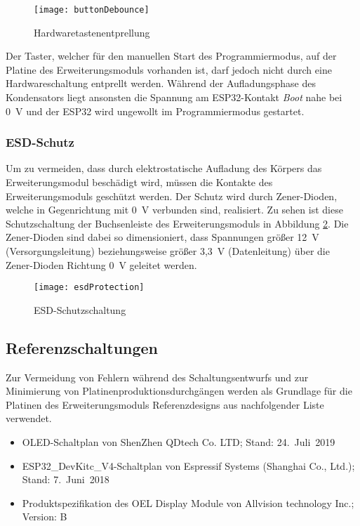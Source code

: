 \begin{figure}[h]
    \centering
    \texttt{[image: buttonDebounce]}
    \caption{Hardwaretastenentprellung}
    \label{fig:buttonDebounce}
\end{figure}

Der Taster, welcher für den manuellen Start des Programmiermodus, auf der Platine des Erweiterungsmoduls vorhanden ist, darf jedoch nicht durch eine Hardwareschaltung entprellt werden.  Während der Aufladungsphase des Kondensators liegt ansonsten die Spannung am ESP32-Kontakt \textit{Boot} nahe bei 0~V und der ESP32 wird ungewollt im Programmiermodus gestartet.

\subsubsection{\acf{ESD}-Schutz}
\label{section:esdProtection}
Um zu vermeiden, dass durch elektrostatische Aufladung des Körpers das Erweiterungsmodul beschädigt wird, müssen die Kontakte des Erweiterungsmoduls geschützt werden. Der Schutz wird durch Zener-Dioden, welche in Gegenrichtung mit 0~V verbunden sind, realisiert. Zu sehen ist diese Schutzschaltung der Buchsenleiste des Erweiterungsmoduls in Abbildung \ref{fig:esdProtection}. Die Zener-Dioden sind dabei so dimensioniert, dass Spannungen größer 12~V (Versorgungsleitung) beziehungsweise größer 3,3~V (Datenleitung) über die Zener-Dioden Richtung 0~V geleitet werden.

\begin{figure}[h]
    \centering
    \texttt{[image: esdProtection]}
    \caption{\ac{ESD}-Schutzschaltung}
    \label{fig:esdProtection}
\end{figure}

\subsection{Referenzschaltungen}
Zur Vermeidung von Fehlern während des Schaltungsentwurfs und zur Minimierung von Platinenproduktionsdurchgängen werden als Grundlage für die Platinen des Erweiterungsmoduls Referenzdesigns aus nachfolgender Liste verwendet.

\begin{itemize}
    \item \acs{OLED}-Schaltplan von ShenZhen QDtech Co. LTD; Stand: 24.~Juli~2019
    \item ESP32\_DevKitc\_V4-Schaltplan von Espressif Systems (Shanghai Co., Ltd.); Stand: 7.~Juni~2018
    \item Produktspezifikation des OEL Display Module von Allvision technology Inc.; Version: B
\end{itemize}

